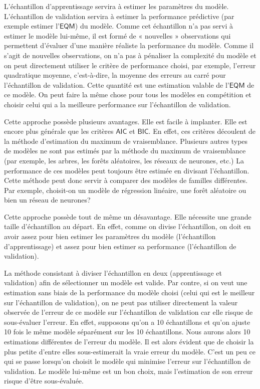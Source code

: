 \documentclass[
  11pt,
  letterpaper,
]{scrbook}
\theoremstyle{definition}
\theoremstyle{remark}
\begin{document}
L'échantillon d'apprentissage servira à estimer les paramètres du
modèle. L'échantillon de validation servira à estimer la performance
prédictive (par exemple estimer l'\(\mathsf{EQM}\)) du modèle. Comme cet
échantillon n'a pas servi à estimer le modèle lui-même, il est formé de
« nouvelles » observations qui permettent d'évaluer d'une manière
réaliste la performance du modèle. Comme il s'agit de nouvelles
observations, on n'a pas à pénaliser la complexité du modèle et on peut
directement utiliser le critère de performance choisi, par exemple,
l'erreur quadratique moyenne, c'est-à-dire, la moyenne des erreurs au
carré pour l'échantillon de validation. Cette quantité est une
estimation valable de l'\(\mathsf{EQM}\) de ce modèle. On peut faire la
même chose pour tous les modèles en compétition et choisir celui qui a
la meilleure performance sur l'échantillon de validation.

Cette approche possède plusieurs avantages. Elle est facile à implanter.
Elle est encore plus générale que les critères \(\mathsf{AIC}\) et
\(\mathsf{BIC}\). En effet, ces critères découlent de la méthode
d'estimation du maximum de vraisemblance. Plusieurs autres types de
modèles ne sont pas estimés par la méthode du maximum de vraisemblance
(par exemple, les arbres, les forêts aléatoires, les réseaux de
neurones, etc.) La performance de ces modèles peut toujours être estimée
en divisant l'échantillon. Cette méthode peut donc servir à comparer des
modèles de familles différentes. Par exemple, choisit-on un modèle de
régression linéaire, une forêt aléatoire ou bien un réseau de neurones?

Cette approche possède tout de même un désavantage. Elle nécessite une
grande taille d'échantillon au départ. En effet, comme on divise
l'échantillon, on doit en avoir assez pour bien estimer les paramètres
du modèle (l'échantillon d'apprentissage) et assez pour bien estimer sa
performance (l'échantillon de validation).

La méthode consistant à diviser l'échantillon en deux (apprentissage et
validation) afin de sélectionner un modèle est valide. Par contre, si on
veut une estimation sans biais de la performance du modèle choisi (celui
qui est le meilleur sur l'échantillon de validation), on ne peut pas
utiliser directement la valeur observée de l'erreur de ce modèle sur
l'échantillon de validation car elle risque de sous-évaluer l'erreur. En
effet, supposons qu'on a 10 échantillons et qu'on ajuste 10 fois le même
modèle séparément sur les 10 échantillons. Nous aurons alors 10
estimations différentes de l'erreur du modèle. Il est alors évident que
de choisir la plus petite d'entre elles sous-estimerait la vraie erreur
du modèle. C'est un peu ce qui se passe lorsqu'on choisit le modèle qui
minimise l'erreur sur l'échantillon de validation. Le modèle lui-même
est un bon choix, mais l'estimation de son erreur risque d'être
sous-évaluée.
\end{document}

